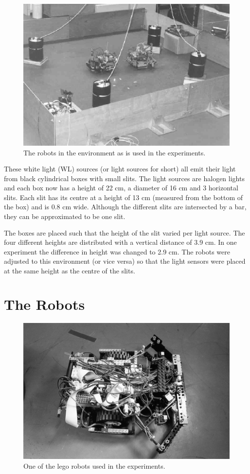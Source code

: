 \begin{figure}[t]
\centerline{\includegraphics[width=\textwidth]{robots//environment.eps}}
\caption{The robots in the environment as is used in the experiments.}
\label{f:robots:envir}
\end{figure}


These white light (WL) sources (or light sources for short) all emit their light from black cylindrical boxes with  small slits. The light sources are halogen lights and each box now has a height of 22 cm, a diameter of 16 cm and 3 horizontal slits. Each slit has its centre at a height of 13 cm (measured from the bottom of the box) and is 0.8 cm wide. Although the different slits are intersected by a bar, they can be approximated to be one slit.

The boxes are placed such that the height of the slit varied per light source. The four different heights are distributed with a vertical distance of 3.9 cm. In one experiment the difference in height was changed to 2.9 cm. The robots were adjusted to this environment (or vice versa) so that the light sensors were placed at the same height as the centre of the slits.

\section{The Robots}\label{s:robots:robots}

\begin{figure}[t]
\centerline{\includegraphics[width=12cm]{robots//robot.eps}}
\caption{One of the {\sc lego} robots used in the experiments.}
\label{f:robots}
\end{figure}

